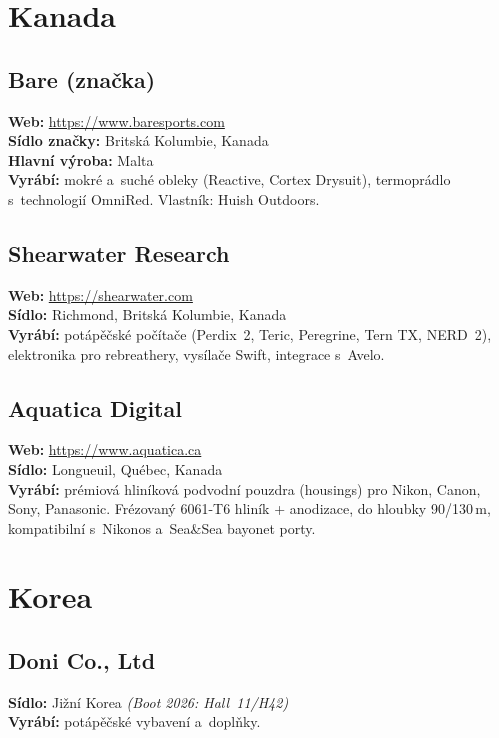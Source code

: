 \documentclass[11pt,a4paper]{article}
\begin{document}
\section{Kanada}

\subsection{Bare (značka)}
\textbf{Web:} \url{https://www.baresports.com} \\
\textbf{Sídlo značky:} Britská Kolumbie, Kanada \\
\textbf{Hlavní výroba:} Malta \\
\textbf{Vyrábí:} mokré a~suché obleky (Reactive, Cortex Drysuit), termoprádlo s~technologií OmniRed. Vlastník: Huish Outdoors.

\subsection{Shearwater Research}
\textbf{Web:} \url{https://shearwater.com} \\
\textbf{Sídlo:} Richmond, Britská Kolumbie, Kanada \\
\textbf{Vyrábí:} potápěčské počítače (Perdix~2, Teric, Peregrine, Tern TX, NERD~2), elektronika pro rebreathery, vysílače Swift, integrace s~Avelo.

\subsection{Aquatica Digital}
\textbf{Web:} \url{https://www.aquatica.ca} \\
\textbf{Sídlo:} Longueuil, Québec, Kanada \\
\textbf{Vyrábí:} prémiová hliníková podvodní pouzdra (housings) pro Nikon, Canon, Sony, Panasonic. Frézovaný 6061-T6 hliník + anodizace, do hloubky 90/130\,m, kompatibilní s~Nikonos a~Sea\&Sea bayonet porty.

\section{Korea}

\subsection{Doni Co., Ltd}
\textbf{Sídlo:} Jižní Korea \quad\emph{(Boot 2026: Hall~11/H42)} \\
\textbf{Vyrábí:} potápěčské vybavení a~doplňky.
\end{document}

